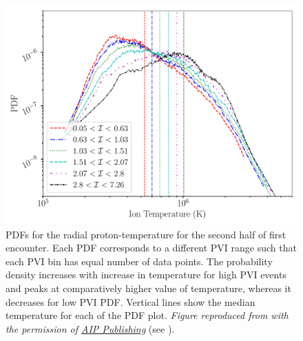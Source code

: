         \begin{figure}
            \begin{center}
                \includegraphics[width=1.\textwidth]{figures/chap6/T_pdf_pvi_psp.pdf}
                \caption[PDF of $T_{\rm \parallel p}$ for various $\mathcal{I}$ for \texttt{psp}
                dataset]{PDFs for the radial proton-temperature for the second half of first
                encounter. Each PDF corresponds to a different PVI range such that each PVI bin has
                equal number of data points. The probability density increases with increase in
                temperature for high PVI events and peaks at comparatively higher value of
                temperature, whereas it decreases for low PVI PDF. Vertical lines show the median
                temperature for each of the PDF plot. \textit{Figure reproduced from
                \citet{Qudsi2020} with the permission of \href{https://publishing.aip.org/}{AIP 
                Publishing}} (see ).}
                \label{fig:pvi_pdf_psp}
            \end{center}
        \end{figure}


